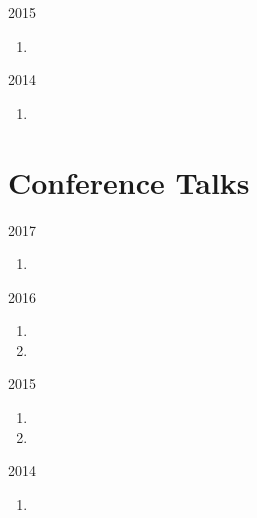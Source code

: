 \begin{paracol}{2}
  \textsc{2015}
\switchcolumn
  \begin{enumerate}
    \setcounter{enumi}{\thepubcounter}
    \item {}
    \setcounter{pubcounter}{\theenumi}
  \end{enumerate}
\end{paracol}

\begin{paracol}{2}
  \textsc{2014}
\switchcolumn
  \begin{enumerate}
    \setcounter{enumi}{\thepubcounter}
    \item {}
    \setcounter{pubcounter}{\theenumi}
  \end{enumerate}
\end{paracol}

\section*{Conference Talks}

\begin{parcol}{2}
  \textsc{2017}
\switchcolumn
  \begin{enumerate}
    \setcounter{enumi}{\thepubcounter}
    \item {}
    \setcounter{pubcounter}{\theenumi}
  \end{enumerate}
\end{parcol}

\begin{paracol}{2}
  \textsc{2016}
\switchcolumn
  \begin{enumerate}
    \setcounter{enumi}{\thepubcounter}
    \item {}
    \item {}
    \setcounter{pubcounter}{\theenumi}
  \end{enumerate}
\end{paracol}

\begin{paracol}{2}
  \textsc{2015}
\switchcolumn
  \begin{enumerate}
    \setcounter{enumi}{\thepubcounter}
    \item {}
    \item {}
    \setcounter{pubcounter}{\theenumi}
  \end{enumerate}
\end{paracol}

\begin{paracol}{2}
  \textsc{2014}
\switchcolumn
  \begin{enumerate}
    \setcounter{enumi}{\thepubcounter}
    \item {}
    \setcounter{pubcounter}{\theenumi}
  \end{enumerate}
\end{paracol}